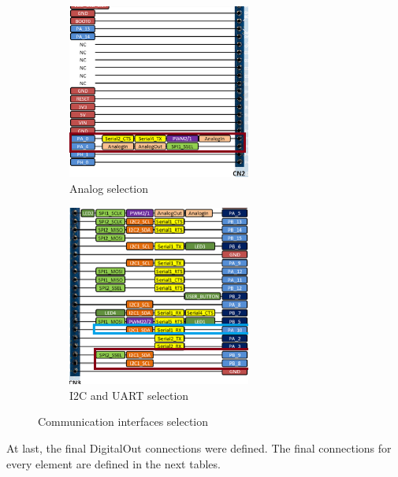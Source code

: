 \begin{figure}[H]
    \centering
    \begin{subfigure}[t]{0.45\textwidth}
        \centering
        \includegraphics[width=0.66\textwidth]{images/3/Analog.png}
        \caption{Analog selection}
    \end{subfigure}
    \begin{subfigure}[t]{0.45\textwidth}
        \centering
        \includegraphics[width=0.66\textwidth]{images/3/I2CSerial.png}
        \caption{I2C and UART selection}
    \end{subfigure}
    \caption{Communication interfaces selection}
    \label{fig:communications}
\end{figure}
\clearpage
At last, the final DigitalOut connections were defined. The final connections for every element are defined in the next tables.
